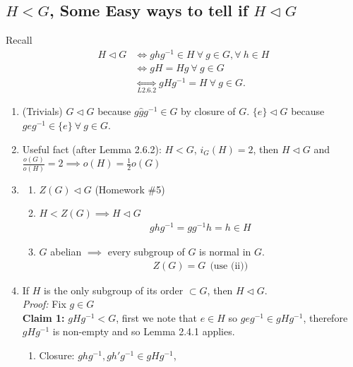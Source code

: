 \subsection*{$H<G$, Some Easy ways to tell if $H\triangleleft G$}
Recall
\begin{align}
    H\triangleleft G &\iff ghg^{-1}\in H \ \forall \ g\in G, \forall \ h\in H \nonumber \\
                     &\iff gH=Hg \ \forall \ g\in G \nonumber \\
                     &\underset{L 2.6.2}{\iff} gHg^{-1}=H \ \forall \ g\in G. \nonumber
\end{align}
\begin{enumerate}
    \item (Trivials) $G\triangleleft G$ because $g\hat{g}g^{-1}\in G$ by closure of $G$. $\{e\}\triangleleft G$ because $geg^{-1} \in \{e\} \ \forall \ g\in G$.
    \item Useful fact (after Lemma 2.6.2): $H<G$, $i_G(H)=2$, then $H\triangleleft G$ and $\frac{o(G)}{o(H)}=2\implies o(H)=\frac{1}{2}o(G)$
    \item \begin{enumerate}[label=\roman*)]
        \item $Z(G)\triangleleft G$ (Homework \#5)
        \item $H<Z(G) \implies H\triangleleft G$
        \begin{align}
            ghg^{-1}=gg^{-1}h=h\in H \nonumber
        \end{align}
        \item $G$ abelian $\implies $ every subgroup of $G$ is normal in $G$.\\
        \begin{align}
            Z(G)=G \ \ \text{(use (ii))}\nonumber
        \end{align}
    \end{enumerate}
    \item If $H$ is the only subgroup of its order $\subset G$, then $H\triangleleft G$.\\
    \textit{Proof:} Fix $g\in G$\\
    \textbf{Claim 1:} $gHg^{-1}< G$, first we note that $e\in H$ so $geg^{-1}\in gHg^{-1}$, therefore $gHg^{-1}$ is non-empty and so Lemma 2.4.1 applies.
    \begin{enumerate}
        \item Closure: $ghg^{-1},gh'g^{-1} \in gHg^{-1}$, \\
        \begin{align}

\end{align}
\end{enumerate}
\end{enumerate}
